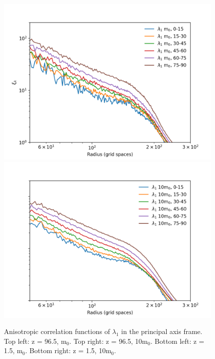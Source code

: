 \documentclass[a4paper,11pt]{article}
\begin{document}
\begin{figure}[!htb]
%
  \includegraphics[trim={1cm 0 0 1.cm},scale=0.57]{aniso_single_light_107_l1.png}
\endminipage
{}
  \includegraphics[trim={1cm 0 0 1.cm},scale=0.57]{aniso_single_mid_107_l1.png}
  
\endminipage\hfill
\caption{Anisotropic correlation functions of $\lambda_1$ in the principal axis frame. Top left: z = 96.5, m$_0$. Top right: z = 96.5, 10m$_0$. Bottom left: z = 1.5, m$_0$. Bottom right: z = 1.5, 10m$_0$.}\label{fig:aniso}
\end{figure}
\end{document}
